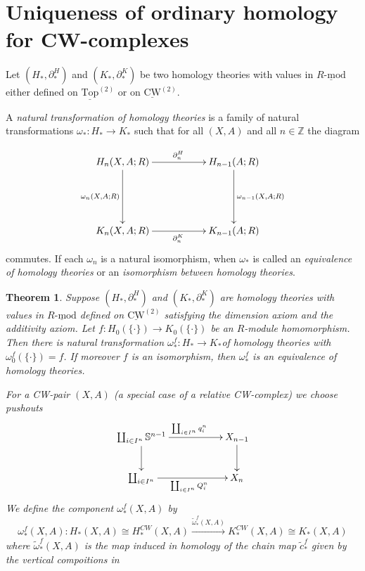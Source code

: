 \documentclass[11pt]{book}
\numberwithin{dummy}{section}
\newtheorem{theorem}{Theorem}[section]
\theoremstyle{nonumberbreak}
\newenvironment{defin}[1][]{\ifthenelse{\equal{#1}{}}{\definition}{\definition[#1]}\rm}{\enddefinition}
\newenvironment{pr}[1][]{\ifthenelse{\equal{#1}{}}{\proof}{\proof[#1]}\rm}{\endproof}
\newenvironment{ex}[1][]{\ifthenelse{\equal{#1}{}}{\example}{\example[#1]}\rm}{\endexample}
\newcommand{\Rmod}{\underline{R\textrm{-}\mathrm{mod}}}
\newcommand{\toptwo}{\underline{\mathrm{Top}}^{(2)}}
\newcommand{\CWtwo}{\underline{\mathrm{CW}}^{\mathrm{(2)}}}
\newcommand{\Sph}{\mathbb{S}}
\newcommand{\la}{\longrightarrow}
\newcommand{\Z}{\mathbb{Z}}
\begin{document}
\begin{spacing}{1.4}
\begin{ex}
\begin{compactenum}
\end{compactenum}

\end{ex}

















\section{Uniqueness of ordinary homology for CW-complexes} %

Let $(H_*, \partial_*^H)$ and $(K_*, \partial_*^K)$ be two homology theories with values in $\Rmod$ either defined on $\toptwo$ or on $\CWtwo$.

\begin{defin}
A \textit{natural transformation of homology theories} is a family of natural transformations $\omega_*: H_* \la K_*$ such that for all $(X,A)$ and all $n \in \Z$ the diagram

$$
\begin{xy}
\xymatrix{
H_n(X,A;R) \ar[rr]^{\partial_n^H} \ar[dd]_{\omega_n(X,A;R)} && H_{n-1}(A;R) \ar[dd]^{\omega_{n-1}(X,A;R)} \\ && \\ K_n(X,A;R) \ar[rr]_{\partial_n^K} && K_{n-1}(A;R) 
}
\end{xy}
$$
commutes. If each $\omega_n$ is a natural isomorphism, when $\omega_*$ is called an \textit{equivalence of homology theories} or an \textit{isomorphism between homology theories}.

\end{defin}


\begin{theorem}
Suppose $(H_*, \partial_*^H)$ and $(K_*, \partial_*^K)$ are homology theories with values in $\Rmod$ defined on $\CWtwo$ satisfying the dimension axiom and the additivity axiom. Let $f: H_0(\{\cdot\}) \la K_0(\{\cdot\})$ be an $R$-module homomorphism. Then there is natural transformation $\omega_*^f: H_* \la K_*$of homology theories with $\omega_0^f(\{\cdot\}) = f$. If moreover $f$ is an isomorphism, then $\omega_*^f$ is an equivalence of homology theories.

\begin{pr}
For a CW-pair $(X,A)$ (a special case of a relative CW-complex) we choose pushouts
$$
\begin{xy}
\xymatrix{
\coprod_{i \in I^n} \Sph^{n-1} \ar[rr]^{\coprod_{i \in I^n} q_i^n} \ar[d] && X_{n-1} \ar[d] \\ \coprod_{i \in I^n} \ar[rr]_{\coprod_{i \in I^n} Q_i^n} && X_n 
}
\end{xy}
$$
We define the component $\omega_*^f(X,A)$ by 
$$\omega_*^f(X,A): H_*(X,A) \cong H_*^{CW}(X,A) \xrightarrow{\tilde{\omega}_*^f(X,A)} K_*^{CW}(X,A) \cong K_*(X,A)$$ 
where $\tilde{\omega}_*^f(X,A)$ is the map induced in homology of the chain map $\tilde{c}_*^f$ given by the vertical compoitions in


\end{pr}
\end{theorem}
\end{spacing}
\end{document}
